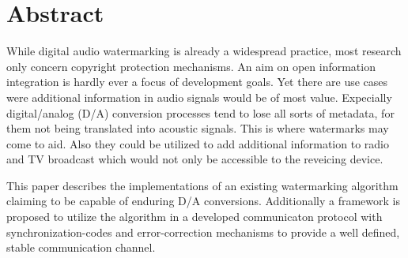 \chapter*{Abstract}

While digital audio watermarking is already a widespread practice, most research only concern copyright protection mechanisms. An aim on open information integration is hardly ever a focus of development goals. Yet there are use cases were additional information in audio signals would be of most value. Expecially digital/analog (D/A) conversion processes tend to lose all sorts of metadata, for them not being translated into acoustic signals.
This is where watermarks may come to aid. Also they could be utilized to add additional information to radio and TV broadcast which would not only be accessible to the reveicing device.

This paper describes the implementations of an existing watermarking algorithm claiming to be capable of enduring D/A conversions. Additionally a framework is proposed to utilize the algorithm in a developed communicaton protocol with synchronization-codes and error-correction mechanisms to provide a well defined, stable communication channel.

